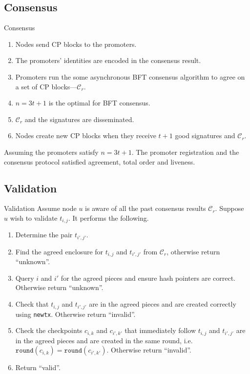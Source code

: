 \documentclass{beamer}
\begin{document}
\subsection{Consensus}
\begin{frame}{Consensus}
  \begin{enumerate}
    \item Nodes send CP blocks to the promoters.
    \item The promoters' identities are encoded in the consensus result.
    \item Promoters run the some asynchronous BFT consensus algorithm to agree on
      a set of CP blocks---$\mathcal{C}_r$.
    \item $n = 3t + 1$ is the optimal for BFT consensus.
    \item $\mathcal{C}_r$ and the signatures are disseminated.
    \item Nodes create new CP blocks when they receive $t + 1$ good signatures and
      $\mathcal{C}_r$.
  \end{enumerate}

  \begin{theorem}
    Assuming the promoters satisfy $n = 3t + 1$. The promoter registration and
    the consensus protocol satisfied agreement, total order and liveness.
  \end{theorem}
\end{frame}

\subsection{Validation}

\begin{frame}{Validation}
Assume node $u$ is aware of all the past consensus results $\mathcal{C}_r$.
Suppose $u$ wish to validate $t_{i,j}$. It performs the following.

\begin{enumerate}
\item Determine the pair $t_{i', j'}$.
\item Find the agreed enclosure for $t_{i,j}$ and $t_{i', j'}$ from
  $\mathcal{C}_r$, otherwise return ``unknown''.
\item Query $i$ and $i'$ for the agreed pieces and ensure hash pointers are
  correct. Otherwise return ``unknown''.
\item Check that $t_{i,j}$ and $t_{i', j'}$ are in the agreed pieces and are
  created correctly using \texttt{newtx}. Otherwise return ``invalid''.
\item Check the checkpoints $c_{i, k}$ and $c_{i', k'}$ that immediately follow
  $t_{i,j}$ and $t_{i', j'}$ are in the agreed pieces and are created in the
  same round, i.e. $\texttt{round}(c_{i, k}) = \texttt{round}(c_{i', k'})$.
  Otherwise return ``invalid''.
\item Return ``valid''.
\end{enumerate}
\end{frame}
\end{document}
